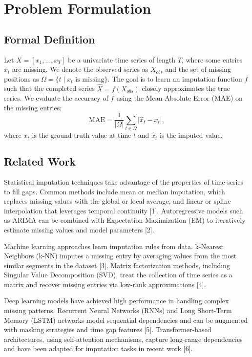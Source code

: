 \documentclass[10pt,twocolumn]{article}
\begin{document}
	\section{Problem Formulation}
	\subsection{Formal Definition}
	Let $X = [x_1, \dots, x_T]$ be a univariate time series of length $T$, where some entries $x_t$ are missing. We denote the observed series as $X_{obs}$ and the set of missing positions as $\Omega = \{t \mid x_t \text{ is missing}\}$. The goal is to learn an imputation function $f$ such that the completed series $\hat{X} = f(X_{obs})$ closely approximates the true series. We evaluate the accuracy of $f$ using the Mean Absolute Error (MAE) on the missing entries:
	\[
	\mathrm{MAE} = \frac{1}{|\Omega|} \sum_{t \in \Omega} \bigl|\hat{x}_t - x_t\bigr|,
	\]
	where $x_t$ is the ground-truth value at time $t$ and $\hat{x}_t$ is the imputed value.
	
	\subsection{Related Work}
	Statistical imputation techniques take advantage of the properties of time series to fill gaps. Common methods include mean or median imputation, which replaces missing values with the global or local average, and linear or spline interpolation that leverages temporal continuity [1]. Autoregressive models such as ARIMA can be combined with Expectation Maximization (EM) to iteratively estimate missing values and model parameters [2].
	
	Machine learning approaches learn imputation rules from data. k-Nearest Neighbors (k-NN) imputes a missing entry by averaging values from the most similar segments in the dataset [3]. Matrix factorization methods, including Singular Value Decomposition (SVD), treat the collection of time series as a matrix and recover missing entries via low-rank approximations [4].
	
	Deep learning models have achieved high performance in handling complex missing patterns. Recurrent Neural Networks (RNNs) and Long Short-Term Memory (LSTM) networks model sequential dependencies and can be augmented with masking strategies and time gap features [5]. Transformer-based architectures, using self-attention mechanisms, capture long-range dependencies and have been adapted for imputation tasks in recent work [6].
	
\end{document}
